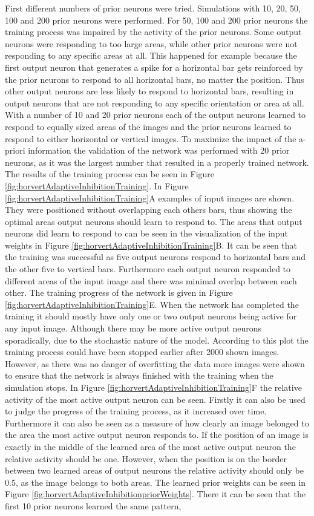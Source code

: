 First different numbers of prior neurons were tried. Simulations with 10, 20, 50, 100 and 200 prior neurons were performed. For 50, 100 and 200 prior neurons the training process was impaired by the activity of the prior neurons. Some output neurons were responding to too large areas, while other prior neurons were not responding to any specific areas at all. This happened for example because the first output neuron that generates a spike for a horizontal bar gets reinforced by the prior neurons to respond to all horizontal bars, no matter the position. Thus other output neurons are less likely to respond to horizontal bars, resulting in output neurons that are not responding to any specific orientation or area at all. With a number of 10 and 20 prior neurons each of the output neurons learned to respond to equally sized areas of the images and the prior neurons learned to respond to either horizontal or vertical images. To maximize the impact of the a-priori information the validation of the network was performed with 20 prior neurons, as it was the largest number that resulted in a properly trained network. The results of the training process can be seen in Figure \ref{fig:horvertAdaptiveInhibitionTraining}. In Figure \ref{fig:horvertAdaptiveInhibitionTraining}A examples of input images are shown. They were positioned without overlapping each others bars, thus showing the optimal areas output neurons should learn to respond to. The areas that output neurons did learn to respond to can be seen in the visualization of the input weights in Figure \ref{fig:horvertAdaptiveInhibitionTraining}B. It can be seen that the training was successful as five output neurons respond to horizontal bars and the other five to vertical bars. Furthermore each output neuron responded to different areas of the input image and there was minimal overlap between each other. The training progress of the network is given in Figure \ref{fig:horvertAdaptiveInhibitionTraining}E. When the network has completed the training it should mostly have only one or two output neurons being active for any input image. Although  there may be more active output neurons sporadically, due to the stochastic nature of the model. According to this plot the training process could have been stopped earlier after 2000 shown images. However, as there was no danger of overfitting the data more images were shown to ensure that the network is always finished with the training when the simulation stops. In Figure \ref{fig:horvertAdaptiveInhibitionTraining}F the relative activity of the most active output neuron can be seen. Firstly it can also be used to judge the progress of the training process, as it increased over time. Furthermore it can also be seen as a measure of how clearly an image belonged to the area the most active output neuron responds to. If the position of an image is exactly in the middle of the learned area of the most active output neuron the relative activity should be one. However, when the position is on the border between two learned areas of output neurons the relative activity should only be 0.5, as the image belongs to both areas. The learned prior weights can be seen in Figure \ref{fig:horvertAdaptiveInhibitionpriorWeights}. There it can be seen that the first 10 prior neurons learned the same pattern, 